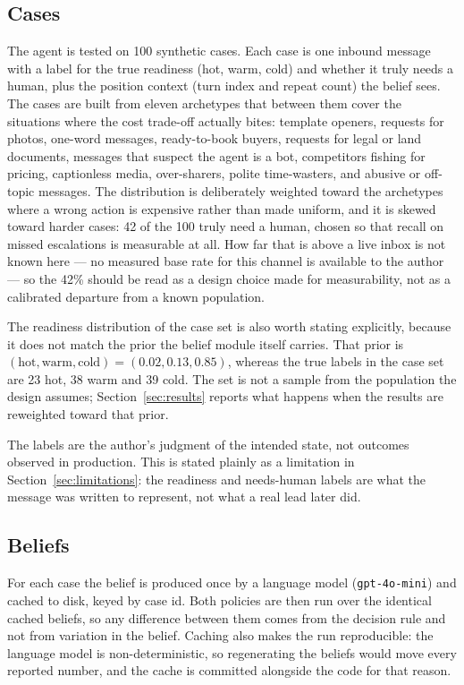 \documentclass{article}
\begin{document}
\subsection{Cases}
The agent is tested on 100 synthetic cases. Each case is one inbound message with
a label for the true readiness (hot, warm, cold) and whether it truly needs a
human, plus the position context (turn index and repeat count) the belief sees.
The cases are built from eleven archetypes that between them cover the situations
where the cost trade-off actually bites: template openers, requests for photos,
one-word messages, ready-to-book buyers, requests for legal or land documents,
messages that suspect the agent is a bot, competitors fishing for pricing,
captionless media, over-sharers, polite time-wasters, and abusive or off-topic
messages. The distribution is deliberately weighted toward the archetypes where a
wrong action is expensive rather than made uniform, and it is skewed toward
harder cases: 42 of the 100 truly need a human, chosen so that recall on missed
escalations is measurable at all. How far that is above a live inbox is not known
here --- no measured base rate for this channel is available to the author --- so
the 42\% should be read as a design choice made for measurability, not as a
calibrated departure from a known population.

The readiness distribution of the case set is also worth stating explicitly,
because it does not match the prior the belief module itself carries. That prior is
$(\text{hot}, \text{warm}, \text{cold}) = (0.02, 0.13, 0.85)$, whereas the true
labels in the case set are 23 hot, 38 warm and 39 cold. The set is not a sample
from the population the design assumes; Section~\ref{sec:results} reports what
happens when the results are reweighted toward that prior.

The labels are the author's judgment of the intended state, not outcomes observed
in production. This is stated plainly as a limitation in
Section~\ref{sec:limitations}: the readiness and needs-human labels are what the
message was written to represent, not what a real lead later did.

\subsection{Beliefs}
For each case the belief is produced once by a language model
(\texttt{gpt-4o-mini}) and cached to disk, keyed by case id. Both policies are
then run over the identical cached beliefs, so any difference between them comes
from the decision rule and not from variation in the belief. Caching also makes
the run reproducible: the language model is non-deterministic, so regenerating the
beliefs would move every reported number, and the cache is committed alongside the
code for that reason.
\end{document}
